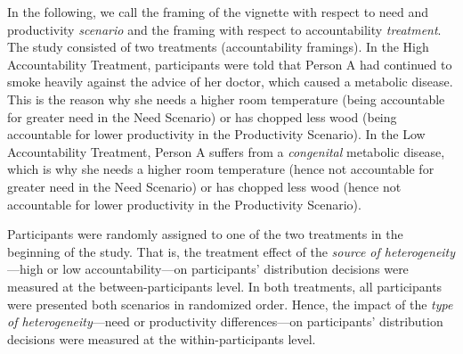 \documentclass[smallcondensed]{svjour3}
\begin{document}
%
In the following, we call the framing of the vignette with respect to need and productivity \textit{scenario} and the framing with respect to accountability \textit{treatment}. The study consisted of two treatments (accountability framings). In the High Accountability Treatment, participants were told that Person A had continued to smoke heavily against the advice of her doctor, which caused a metabolic disease. This is the reason why she needs a higher room temperature (being accountable for greater need in the Need Scenario) or has chopped less wood (being accountable for lower productivity in the Productivity Scenario). In the Low Accountability Treatment, Person A suffers from a \textit{congenital} metabolic disease, which is why she needs a higher room temperature (hence not accountable for greater need in the Need Scenario) or has chopped less wood (hence not accountable for lower productivity in the Productivity Scenario).\par
%
Participants were randomly assigned to one of the two treatments in the beginning of the study. That is, the treatment effect of the \textit{source of heterogeneity}---high or low accountability---on participants' distribution decisions were measured at the between-participants level. In both treatments, all participants were presented both scenarios in randomized order. Hence, the impact of the \textit{type of heterogeneity}---need or productivity differences---on participants' distribution decisions were measured at the within-participants level.\par
%
\end{document}
